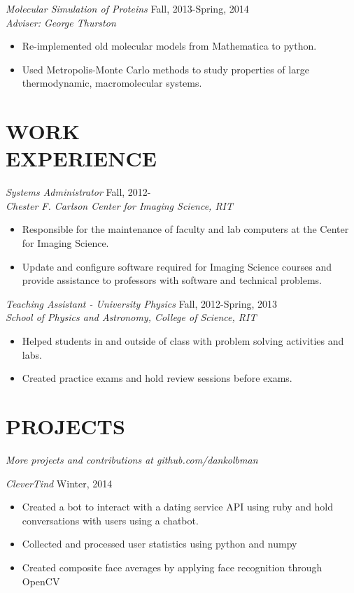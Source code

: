 \documentclass[margin]{res}
\begin{document}
\begin{resume}
  {\sl Molecular Simulation of Proteins} \hfill   Fall, 2013-Spring, 2014 \\
  {\sl Adviser: George Thurston}\\                
  \begin{itemize}
    \item Re-implemented old molecular models from Mathematica to python.
    \item Used Metropolis-Monte Carlo methods to study 
      properties of large thermodynamic, macromolecular systems.
  \end{itemize}


\section{WORK\\EXPERIENCE}

  {\sl Systems Administrator} \hfill            Fall, 2012- \\
  {\sl Chester F. Carlson Center for Imaging Science, RIT}\\
  \begin{itemize}
    \item Responsible for the maintenance of faculty and lab computers
      at the Center for Imaging Science.
    \item Update and configure software required for Imaging Science courses
      and provide assistance to professors with software and technical problems.
  \end{itemize}

  {\sl Teaching Assistant - University Physics} \hfill            Fall, 2012-Spring, 2013 \\
  {\sl School of Physics and Astronomy, College of Science, RIT}\\
  \begin{itemize}
    \item Helped students in and outside of class with problem solving activities and labs.
    \item Created practice exams and hold review sessions before exams.
  \end{itemize}

\section{PROJECTS}
  {\sl More projects and contributions at github.com/dankolbman}

  {\sl CleverTind} \hfill            Winter, 2014 \\
  \begin{itemize}
    \item Created a bot to interact with a dating service API using ruby and hold
      conversations with users using a chatbot.
    \item Collected and processed user statistics using python and numpy
    \item Created composite face averages by applying face recognition through
      OpenCV
  \end{itemize}


\end{resume}
\end{document}
